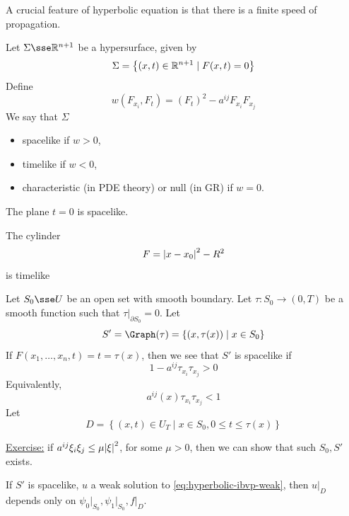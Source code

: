 \documentclass{article}
\begin{document}
A crucial feature of hyperbolic equation is that there is a finite speed of propagation.

\begin{definition}
    Let \(\Sigma \sse \R^{n+1}\) be a hypersurface, given by
    \[\Sigma = \left\{(x, t) \in \mathbb{R}^{n+1} \mid F(x, t) = 0\right\}\]
    Define
    \[w(F_{x_i}, F_t) = (F_t)^2 - a^{ij}F_{x_i}F_{x_j}\]
    We say that \(\Sigma\) \begin{itemize}
        \item spacelike if \(w > 0\),
        \item timelike if \(w < 0\),
        \item characteristic (in PDE theory) or null (in GR) if \(w = 0\).
    \end{itemize}
\end{definition}

\begin{example}
    The plane \(t = 0\) is spacelike.
\end{example}

\begin{example}
    The cylinder
    \[F = \abs{x - x_0}^2 - R^2\]
    is timelike
\end{example}

Let \(S_0 \sse U\) be an open set with smooth boundary. Let \(\tau : S_0 \to (0, T)\) be a smooth function such that \(\tau\vert_{\partial S_0} = 0\). Let 
\[S' = \Graph(\tau) = \left\{(x, \tau(x)) \mid x \in S_0\right\}\]
If \(F(x_1, \dots, x_n, t) = t = \tau(x)\), then we see that \(S'\) is spacelike if
\[1 - a^{ij}\tau_{x_i}\tau_{x_j} > 0\]
Equivalently,
\[a^{ij}(x)\tau_{x_i}\tau_{x_j} < 1\]
Let
\[D = \left\{(x, t) \in U_T \mid x \in S_0, 0 \le t \le \tau(x)\right\}\]

\underline{Exercise:} if \(a^{ij}\xi_i\xi_j \le \mu\abs{\xi}^2\), for some \(\mu > 0\), then we can show that such \(S_0, S'\) exists.

\begin{theorem}
      If \(S'\) is spacelike, \(u\) a weak solution to \cref{eq:hyperbolic-ibvp-weak}, then \(u\vert_D\) depends only on \(\psi_0\vert_{S_0}, \psi_1\vert_{S_0}, f\vert_D\).
\end{theorem}

\lec
\end{document}
